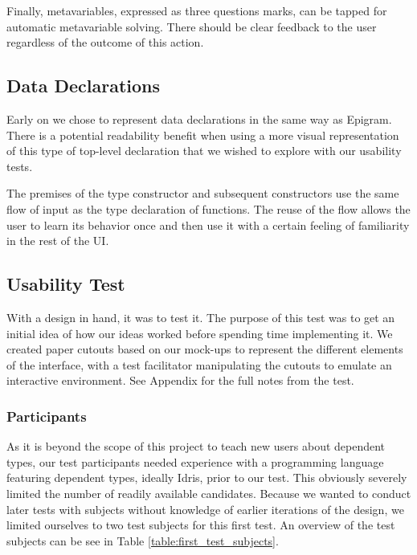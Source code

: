 Finally, metavariables,
expressed as three questions marks, can be tapped for automatic metavariable
solving. There should be clear feedback to the user regardless of the outcome
of this action.

\subsection{Data Declarations}
Early on we chose to represent data declarations in the same way as Epigram.
There is a potential readability benefit when using a more visual
representation of this type of top-level declaration that we wished to explore
with our usability tests.

The premises of the type constructor and subsequent constructors use the same flow of input as the type declaration of functions.
The reuse of the flow allows the user to learn its behavior once and then use it with a certain feeling of familiarity
in the rest of the UI.


\subsection{Usability Test}
\label{sec:UsabilityTest}
With a design in hand, it was to test it. The purpose of this test was to get
an initial idea of how our ideas worked before spending time implementing it.
We created paper cutouts based on our mock-ups to represent the different
elements of the interface, with a test facilitator manipulating the cutouts to
emulate an interactive environment. See Appendix  for the full notes
from the test.

\subsubsection{Participants}
As it is beyond the scope of this project to teach new users about dependent
types, our test participants needed experience with a programming language
featuring dependent types, ideally Idris, prior to our test. This obviously
severely limited the number of readily available candidates. Because we wanted
to conduct later tests with subjects without knowledge of earlier iterations of
the design, we limited ourselves to two test subjects for this first test. An
overview of the test subjects can be see in Table \ref{table:first_test_subjects}.

